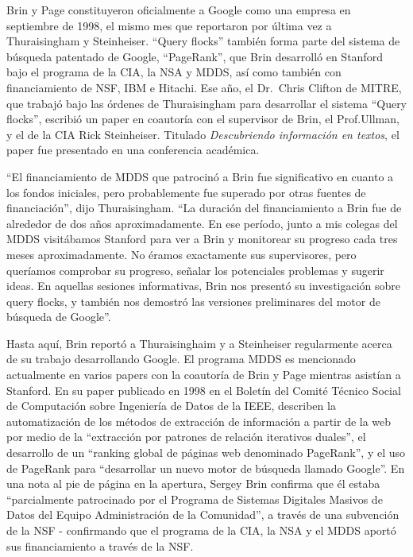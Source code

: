 \documentclass[10pt,a5paper,twoside,spanish,]{book}
\begin{document}
Brin y Page constituyeron oficialmente a Google como una empresa en
septiembre de 1998, el mismo mes que reportaron por última vez a
Thuraisingham y Steinheiser. ``Query flocks'' también forma parte del
sistema de búsqueda patentado de Google, ``PageRank'', que Brin
desarrolló en Stanford bajo el programa de la CIA, la NSA y MDDS, así
como también con financiamiento de NSF, IBM e Hitachi. Ese año, el
Dr.~Chris Clifton de MITRE, que trabajó bajo las órdenes de
Thuraisingham para desarrollar el sistema ``Query flocks'', escribió un
paper en coautoría con el supervisor de Brin, el Prof.Ullman, y el de la
CIA Rick Steinheiser. Titulado \emph{Descubriendo información en
textos}, el paper fue presentado en una conferencia académica.

``El financiamiento de MDDS que patrocinó a Brin fue significativo en
cuanto a los fondos iniciales, pero probablemente fue superado por otras
fuentes de financiación'', dijo Thuraisingham. ``La duración del
financiamiento a Brin fue de alrededor de dos años aproximadamente. En
ese período, junto a mis colegas del MDDS visitábamos Stanford para ver
a Brin y monitorear su progreso cada tres meses aproximadamente. No
éramos exactamente sus supervisores, pero queríamos comprobar su
progreso, señalar los potenciales problemas y sugerir ideas. En aquellas
sesiones informativas, Brin nos presentó su investigación sobre query
flocks, y también nos demostró las versiones preliminares del motor de
búsqueda de Google''.

Hasta aquí, Brin reportó a Thuraisinghaim y a Steinheiser regularmente
acerca de su trabajo desarrollando Google. El programa MDDS es
mencionado actualmente en varios papers con la coautoría de Brin y Page
mientras asistían a Stanford. En su paper publicado en 1998 en el
Boletín del Comité Técnico Social de Computación sobre Ingeniería de
Datos de la IEEE, describen la automatización de los métodos de
extracción de información a partir de la web por medio de la
``extracción por patrones de relación iterativos duales'', el desarrollo
de un ``ranking global de páginas web denominado PageRank'', y el uso de
PageRank para ``desarrollar un nuevo motor de búsqueda llamado Google''.
En una nota al pie de página en la apertura, Sergey Brin confirma que él
estaba ``parcialmente patrocinado por el Programa de Sistemas Digitales
Masivos de Datos del Equipo Administración de la Comunidad'', a través
de una subvención de la NSF - confirmando que el programa de la CIA, la
NSA y el MDDS aportó sus financiamiento a través de la NSF.
\end{document}
